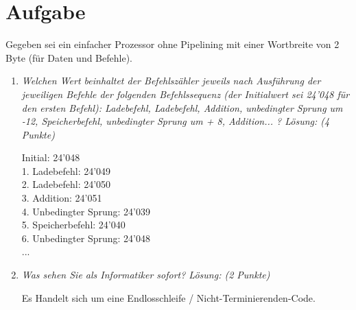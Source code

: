 \documentclass[10pt]{article}
\begin{document}
\section{Aufgabe}
Gegeben sei ein einfacher Prozessor ohne Pipelining mit einer Wortbreite von 2 Byte (für Daten und Befehle). 
\begin{enumerate}[label=\alph*)]
	\item 
	\textit{Welchen Wert beinhaltet der Befehlszähler jeweils nach Ausführung der jeweiligen Befehle der folgenden Befehlssequenz (der Initialwert sei 24'048 für den ersten Befehl): Ladebefehl, Ladebefehl, Addition, unbedingter Sprung um -12, Speicherbefehl, unbedingter Sprung um + 8, Addition... ? Lösung: (4 Punkte)}
	
	Initial: 24'048\\
	1. Ladebefehl: 24'049\\
	2. Ladebefehl: 24'050\\
	3. Addition: 24'051\\
	4. Unbedingter Sprung: 24'039 \\
	5. Speicherbefehl: 24'040\\
	6. Unbedingter Sprung: 24'048 \\
	...
	\item
	\textit{Was sehen Sie als Informatiker sofort? Lösung: (2 Punkte)}
	
	Es Handelt sich um eine Endlosschleife / Nicht-Terminierenden-Code.
		
\end{enumerate}

\newpage

\end{document}
